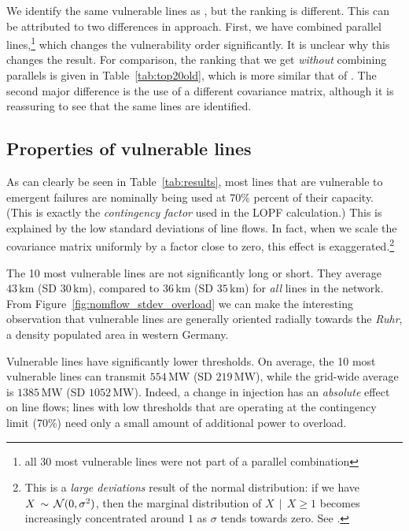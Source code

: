 \documentclass[main.tex]{subfiles}
\begin{document}
We identify the same vulnerable lines as \cite{Nesti2018supplemental}, but the ranking is different. This can be attributed to two differences in approach. First, we have combined parallel lines,\footnote{all 30 most vulnerable lines were not part of a parallel combination} which changes the vulnerability order significantly. It is unclear why this changes the result. For comparison, the ranking that we get \emph{without} combining parallels is given in Table~\ref{tab:top20old}, which is more similar that of \cite{Nesti2018supplemental}. The second major difference is the use of a different covariance matrix, although it is reassuring to see that the same lines are identified.

\subsection{Properties of vulnerable lines}
As can clearly be seen in Table~\ref{tab:results}, most lines that are vulnerable to emergent failures are nominally being used at 70\% percent of their capacity. (This is exactly the \emph{contingency factor} used in the LOPF calculation.) This is explained by the low standard deviations of line flows. In fact, when we scale the covariance matrix uniformly by a factor close to zero, this effect is exaggerated.\footnote{This is a \emph{large deviations} result of the normal distribution: if we have $X \, \sim \, \operatorname{\mathcal{N}}(0, \sigma^2)$, then the marginal distribution of $X \, \mid \, X \geq 1$ becomes increasingly concentrated around $1$ as $\sigma$ tends towards zero. See \eg \cite{Touchette2011}.}

The 10 most vulnerable lines are not significantly long or short. They average $43\,\si{\kilo\meter}$ (SD $30 \,\si{\kilo\meter}$), compared to $36\,\si{\kilo\meter}$ (SD $35 \,\si{\kilo\meter}$) for \emph{all} lines in the network. From Figure~\ref{fig:nomflow_stdev_overload} we can make the interesting observation that vulnerable lines are generally oriented radially towards the \emph{Ruhr}, a density populated area in western Germany.

Vulnerable lines have significantly lower thresholds. On average, the 10 most vulnerable lines can transmit $554 \, \si{\mega\watt}$ (SD $219 \, \si{\mega\watt}$), while the grid-wide average is $1385 \, \si{\mega\watt}$ (SD $1052 \, \si{\mega\watt}$). Indeed, a change in injection has an \emph{absolute} effect on line flows; lines with low thresholds that are operating at the contingency limit (70\%) need only a small amount of additional power to overload.
\end{document}
